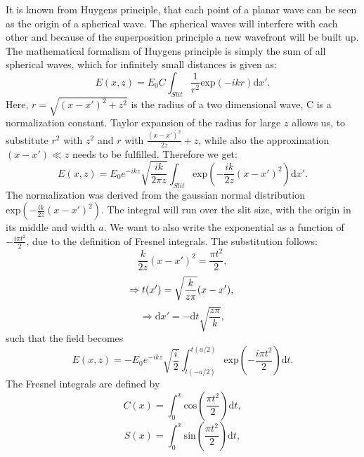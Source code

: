 It is known from Huygens principle, that each point of a planar wave can be seen as the origin of a spherical wave. The spherical waves will interfere with each other and because of the superposition principle a new wavefront will be built up.
The mathematical formalism of Huygens principle is simply the sum of all spherical waves, which for infinitely small distances is given as\cite{Steck2012}:
\begin{equation}
E(x,z) = E_0 C \int_{Slit} \frac{1}{r^2} \mathrm{exp}(-ikr)\mathrm{d}x'.
\end{equation}
Here, $r=\sqrt{(x-x')^2 + z^2}$ is the radius of a two dimensional wave, C is a normalization constant.
Taylor expansion of the radius for large $z$ allows us, to substitute $r^2$ with $z^2$ and $r$ with $\frac{(x-x')^2}{2z} + z$, while also the approximation $(x-x') \ll z$ needs to be fulfilled. Therefore we get:
\begin{equation}
E(x,z) = E_0 e^{-ikz}\sqrt{\frac{ik}{2\pi z}}\int_{Slit} \mathrm{exp}\left( -\frac{ik}{2z}(x-x')^2\right) \mathrm{d}x'.
\end{equation}
The normalization was derived from the gaussian normal distribution $\mathrm{exp}( -\frac{ik}{2z}(x-x')^2)$. The integral will run over the slit size, with the origin in its middle and width $a$.
We want to also write the exponential as a function of $-\frac{i\pi t^2}{2}$, due to the definition of Fresnel integrals. The substitution follows:
\begin{equation}
\frac{k}{2z}(x-x')^2 = \frac{\pi t^2}{2},
\end{equation}
\begin{equation}
\Rightarrow t(x') = \sqrt{\frac{k}{z\pi}}(x-x'), \\
\end{equation}
\begin{equation}
\Rightarrow \mathrm{d}x' = -\mathrm{d}t \sqrt{\frac{z\pi}{k}},
\end{equation}
such that the field becomes
\begin{equation}
E(x,z) = -E_0 e^{-ikz}\sqrt{\frac{i}{2}}\int_{t(-a/2)}^{t(a/2)} \mathrm{exp}\left( -\frac{i\pi t^2}{2}\right) \mathrm{d}t.
\end{equation}
The Fresnel integrals are defined by
\begin{equation}
C(x) = \int_0^x \mathrm{cos}\left(\frac{\pi t^2}{2}\right)\mathrm{d}t,
\end{equation}
\begin{equation}
S(x) = \int_0^x \mathrm{sin}\left(\frac{\pi t^2}{2}\right)\mathrm{d}t,
\end{equation}

